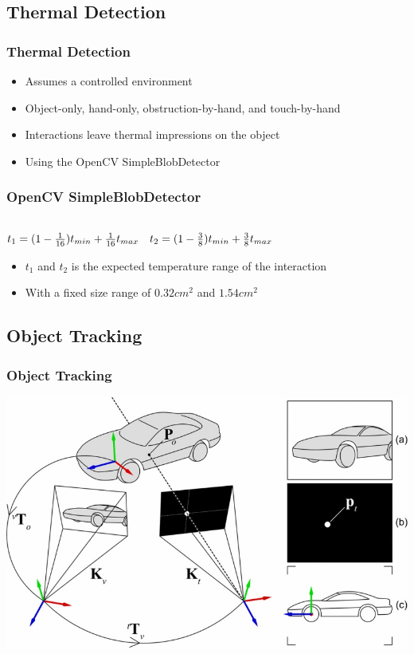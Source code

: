 \documentclass{beamer}
\begin{document}
\subsection{Thermal Detection}
\begin{frame}
\frametitle{Thermal Detection}
	\begin{itemize}
		\item Assumes a controlled environment
		\item Object-only, hand-only, obstruction-by-hand, and touch-by-hand
		\item Interactions leave thermal impressions on the object
		\item Using the OpenCV SimpleBlobDetector
	\end{itemize}
\end{frame}


\begin{frame}
\frametitle{OpenCV SimpleBlobDetector}
\(
\begin{matrix} \\
 t_{1}=(1-{1\over 16})t_{ min}+{1\over 16}t_{ max} & t_{2}=(1-{3\over 8})t_{ min}+{3\over 8}t_{ max}\cr 
 \end{matrix} 
\)

	\begin{itemize}
		\item \(t_{1}\) and \(t_{2}\) is the expected temperature range of the interaction
		\item With a fixed size range of \(0.32cm^2\) and \(1.54cm^2\)
	\end{itemize}
\end{frame}

\subsection{Object Tracking}
\begin{frame}	
\frametitle{Object Tracking}
\includegraphics[width=\textwidth]{../Sample_paper/images/Tracking}
\end{frame}
\end{document}
